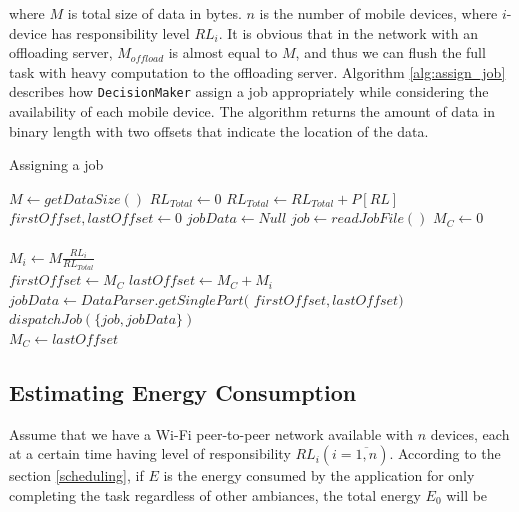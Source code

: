 \documentclass{sig-alternate}[10pt]
\begin{document}
\noindent where $M$ is total size of data in bytes. $n$ is the number of mobile devices, where $i$-device has responsibility level $RL_{i}$. It is obvious that in the network with an offloading server, $M_{offload}$ is almost equal to $M$, and thus we can flush the full task with heavy computation to the offloading server. Algorithm \ref{alg:assign_job} describes how \texttt{DecisionMaker} assign a job appropriately while considering the availability of each mobile device. The algorithm returns the amount of data in binary length with two offsets that indicate the location of the data.

\begin{algorithm}
\caption{Assigning a job}
\label{alg:assign_job}
\begin{algorithmic}[1]
\begin{scriptsize}
\State $M \leftarrow {getDataSize()}$
\State $RL_{Total} \leftarrow 0$ 
  \State $RL_{Total} \leftarrow RL_{Total} + P[RL]$
\EndFor
\\
\State $firstOffset, lastOffset \leftarrow 0$
\State $jobData \leftarrow Null$
\State $job \leftarrow {readJobFile()}$
\State $M_{C} \leftarrow 0$
\\
\\
  \State $M_{i} \leftarrow M\frac{RL_{i}}{RL_{Total}}$\\
  \State $firstOffset \leftarrow M_{C} $
  \State $lastOffset \leftarrow M_{C} + M_{i}$
  \State $jobData \leftarrow DataParser.getSinglePart($
  \State 
		\hspace{\algorithmicindent}
		\hspace{\algorithmicindent}
		\hspace{\algorithmicindent}
		\hspace{\algorithmicindent}
		\hspace{\algorithmicindent}
						$firstOffset, lastOffset)$
  \State $dispatchJob(\{job, jobData\})$\\
  \State $M_{C} \leftarrow lastOffset$
  
\EndFor

\EndFunction
\end{scriptsize}
\end{algorithmic}
\end{algorithm}

\subsection{Estimating Energy Consumption}
Assume that we have a Wi-Fi peer-to-peer network available with $n$ devices, each at a certain time having level of responsibility $RL_{i} (i = \overline{1,n})$. According to the section \ref{scheduling}, if $E$ is the energy consumed by the application for only completing the task regardless of other ambiances, the total energy $E_{0}$ will be
\end{document}
